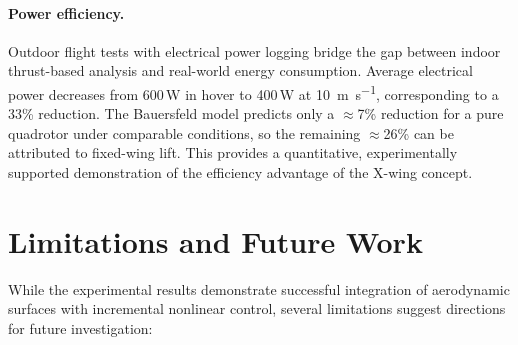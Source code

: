 \paragraph{Power efficiency.}
Outdoor flight tests with electrical power logging bridge the gap between indoor thrust-based analysis and real-world energy consumption.
Average electrical power decreases from 600\,W in hover to 400\,W at \SI{10}{\meter\per\second}, corresponding to a 33\% reduction.
The Bauersfeld model predicts only a $\approx$7\% reduction for a pure quadrotor under comparable conditions, so the remaining $\approx$26\% can be attributed to fixed-wing lift.
This provides a quantitative, experimentally supported demonstration of the efficiency advantage of the X-wing concept.

\section{Limitations and Future Work}\label{sec:limitations}

While the experimental results demonstrate successful integration of aerodynamic surfaces with incremental nonlinear control, several limitations suggest directions for future investigation:

